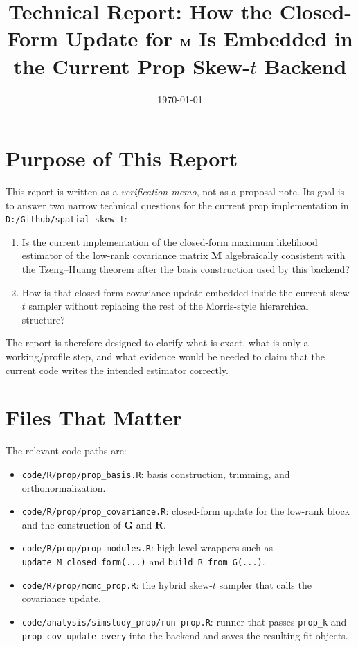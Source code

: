 \documentclass[11pt]{article}
\title{Technical Report: How the Closed-Form Update for \texorpdfstring{$\bM$}{M} Is Embedded in the Current Prop Skew-\texorpdfstring{$t$}{t} Backend}
\author{}
\date{\today}
\newcommand{\bR}{\mathbf{R}}
\newcommand{\bG}{\mathbf{G}}
\newcommand{\bM}{\mathbf{M}}
\begin{document}
\maketitle

\section{Purpose of This Report}

This report is written as a \emph{verification memo}, not as a proposal note.
Its goal is to answer two narrow technical questions for the current prop
implementation in \texttt{D:/Github/spatial-skew-t}:

\begin{enumerate}[label=\arabic*.]
\item Is the current implementation of the closed-form maximum likelihood
estimator of the low-rank covariance matrix $\bM$ algebraically consistent with
the Tzeng--Huang theorem after the basis construction used by this backend?
\item How is that closed-form covariance update embedded inside the current
skew-$t$ sampler without replacing the rest of the Morris-style hierarchical
structure?
\end{enumerate}

The report is therefore designed to clarify what is exact, what is only a
working/profile step, and what evidence would be needed to claim that the
current code writes the intended estimator correctly.

\section{Files That Matter}

The relevant code paths are:

\begin{itemize}
\item \texttt{code/R/prop/prop\_basis.R}: basis construction, trimming, and
orthonormalization.
\item \texttt{code/R/prop/prop\_covariance.R}: closed-form update for the
low-rank block and the construction of $\bG$ and $\bR$.
\item \texttt{code/R/prop/prop\_modules.R}: high-level wrappers such as
\texttt{update\_M\_closed\_form(...)} and
\texttt{build\_R\_from\_G(...)}.
\item \texttt{code/R/prop/mcmc\_prop.R}: the hybrid skew-$t$ sampler that calls
the covariance update.
\item \texttt{code/analysis/simstudy\_prop/run-prop.R}: runner that passes
\texttt{prop\_k} and \texttt{prop\_cov\_update\_every} into the backend and
saves the resulting fit objects.
\end{itemize}
\end{document}
